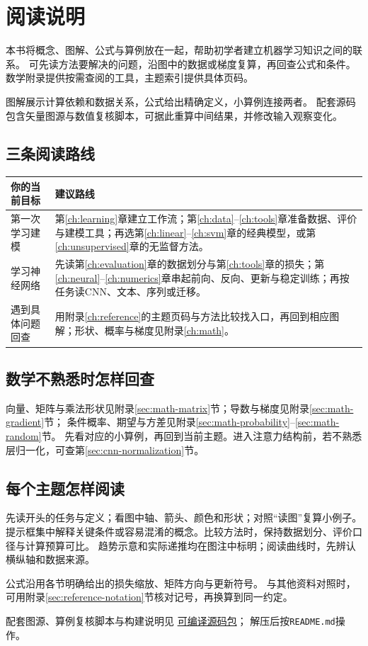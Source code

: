 \chapter*{阅读说明}
本书将概念、图解、公式与算例放在一起，帮助初学者建立机器学习知识之间的联系。
可先读方法要解决的问题，沿图中的数据或梯度复算，再回查公式和条件。
数学附录提供按需查阅的工具，主题索引提供具体页码。

\begin{keyidea}[图、公式与计算]
图解展示计算依赖和数据关系，公式给出精确定义，小算例连接两者。
配套源码包含矢量图源与数值复核脚本，可据此重算中间结果，并修改输入观察变化。
\end{keyidea}

\section*{三条阅读路线}
\begin{center}
\begin{tabularx}{\textwidth}{P{30mm}Y}
\toprule
你的当前目标 & 建议路线\\
\midrule
第一次学习建模 & 第\ref{ch:learning}章建立工作流；第\ref{ch:data}--\ref{ch:tools}章准备数据、评价与建模工具；再选第\ref{ch:linear}--\ref{ch:svm}章的经典模型，或第\ref{ch:unsupervised}章的无监督方法。\\
学习神经网络 & 先读第\ref{ch:evaluation}章的数据划分与第\ref{ch:tools}章的损失；第\ref{ch:neural}--\ref{ch:numerics}章串起前向、反向、更新与稳定训练；再按任务读CNN、文本、序列或迁移。\\
遇到具体问题回查 & 用附录\ref{ch:reference}的主题页码与方法比较找入口，再回到相应图解；形状、概率与梯度见附录\ref{ch:math}。\\
\bottomrule
\end{tabularx}
\end{center}

\section*{数学不熟悉时怎样回查}
向量、矩阵与乘法形状见附录\ref{sec:math-matrix}节；导数与梯度见附录\ref{sec:math-gradient}节；
条件概率、期望与方差见附录\ref{sec:math-probability}--\ref{sec:math-random}节。
先看对应的小算例，再回到当前主题。进入注意力结构前，若不熟悉层归一化，可查第\ref{sec:cnn-normalization}节。

\section*{每个主题怎样阅读}
先读开头的任务与定义；看图中轴、箭头、颜色和形状；对照“读图”复算小例子。
提示框集中解释关键条件或容易混淆的概念。比较方法时，保持数据划分、评价口径与计算预算可比。
趋势示意和实际递推均在图注中标明；阅读曲线时，先辨认横纵轴和数据来源。

公式沿用各节明确给出的损失缩放、矩阵方向与更新符号。
与其他资料对照时，可用附录\ref{sec:reference-notation}节核对记号，再换算到同一约定。

配套图源、算例复核脚本与构建说明见
\href{https://github.com/zhang-haifei/ML-Cheat-Sheet/blob/main/review/handbook-source.zip}{可编译源码包}；
解压后按\texttt{README.md}操作。
